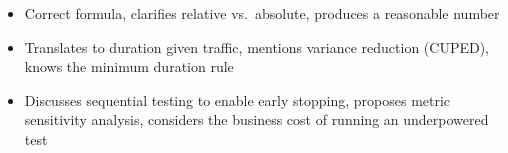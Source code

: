 \begin{interviewq}
\goodgreat
\begin{itemize}
    \item {} Correct formula, clarifies relative vs.\ absolute, produces a reasonable number
    \item {} Translates to duration given traffic, mentions variance reduction (CUPED), knows the minimum duration rule
    \item {} Discusses sequential testing to enable early stopping, proposes metric sensitivity analysis, considers the business cost of running an underpowered test
\end{itemize}

\end{interviewq}

